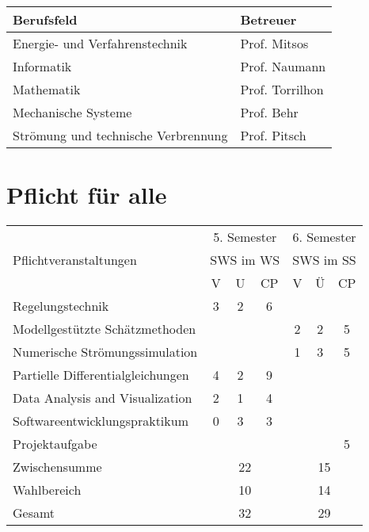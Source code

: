 \documentclass{lecture}
\begin{document}
	\begin{center}
		\begin{tabular}{ll}
			\toprule
			Berufsfeld & Betreuer\\
			\midrule
			Energie- und Verfahrenstechnik & Prof. Mitsos\\
			Informatik & Prof. Naumann\\
			Mathematik & Prof. Torrilhon\\
			Mechanische Systeme & Prof. Behr\\
			Strömung und technische Verbrennung & Prof. Pitsch\\
			\bottomrule
		\end{tabular}
	\end{center}


	\section{Pflicht für alle}

	\begin{center}
		\begin{tabular}{lcccccc}
			\toprule
			\multirow{3}{*}{Pflichtveranstaltungen} & \multicolumn{3}{c}{5. Semester} & \multicolumn{3}{c}{6. Semester}\\
			& \multicolumn{3}{c}{SWS im WS} & \multicolumn{3}{c}{SWS im SS}\\
			& V & U & CP & V & Ü & CP\\
			\midrule
			Regelungstechnik & 3 & 2 & 6 & & & \\
			Modellgestützte Schätzmethoden & & & & 2 & 2 & 5\\
			Numerische Strömungssimulation & & & & 1 & 3 & 5\\
			Partielle Differentialgleichungen & 4 & 2 & 9 & & & \\
			Data Analysis and Visualization & 2 & 1 & 4 & & & \\
			Softwareentwicklungspraktikum & 0 & 3 & 3 & & & \\
			Projektaufgabe & & & & & & 5\\
			\midrule
			Zwischensumme & \multicolumn{3}{c}{22} & \multicolumn{3}{c}{15}\\
			Wahlbereich & \multicolumn{3}{c}{10} & \multicolumn{3}{c}{14}\\
			Gesamt & \multicolumn{3}{c}{32} & \multicolumn{3}{c}{29}\\
			\bottomrule
		\end{tabular}
	\end{center}
\end{document}
